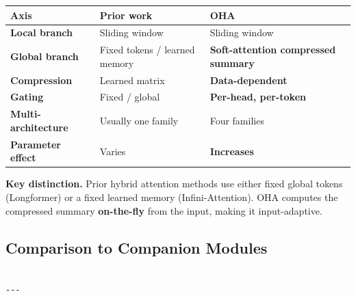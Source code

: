 \begin{table}[H]
\centering
\small
\begin{tabular}{lll}
\toprule
\textbf{Axis} & \textbf{Prior work} & \textbf{OHA} \\
\midrule
\textbf{Local branch} & Sliding window & Sliding window \\
\textbf{Global branch} & Fixed tokens / learned memory & \textbf{Soft-attention compressed summary} \\
\textbf{Compression} & Learned matrix & \textbf{Data-dependent} \\
\textbf{Gating} & Fixed / global & \textbf{Per-head, per-token} \\
\textbf{Multi-architecture} & Usually one family & Four families \\
\textbf{Parameter effect} & Varies & \textbf{Increases} \\
\bottomrule
\end{tabular}
\end{table}

\textbf{Key distinction.} Prior hybrid attention methods use either fixed global 
tokens (Longformer) or a fixed learned memory (Infini-Attention). OHA 
computes the compressed summary \textbf{on-the-fly} from the input, making it 
input-adaptive.

\subsection{Comparison to Companion Modules}

\begin{lstlisting}

---
\end{lstlisting}